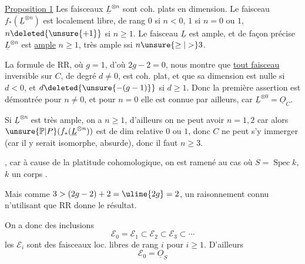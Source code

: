 

\uline{Proposition 1} Les faisceaux $\underline L^{\otimes n}$ sont coh. plats en  dimension. Le faisceau $f_*(\underline L^{\otimes n})$ est localement libre, de rang $0$ si $n<0$, $1$ si $n=0$ ou $1$, $n\deleted{\unsure{+1}}$ si $n\geq1$.  Le faisceau $\underline L$ est ample, et de façon précise $\underline L^{\otimes n}$ est  \uline{ample}   $n\geq1$, très ample ssi $n\unsure{\geq|>}3$.

La formule de RR, où $g=1$, d'où $2g-2=0$, nous montre que \uline{tout faisceau}  inversible sur $C$, de degré  $d\neq0$, est coh. plat, et que sa dimension est  nulle si $d<0$, et $d\deleted{\unsure{-(g-1)}}$ si $d\geq1$. Donc la première assertion est démontrée pour $n\neq0$, et pour $n=0$ elle est connue par ailleurs, car $\underline L^{\otimes0}=\underline O_C$.

Si $\underline L^{\otimes n}$ est très ample, on a $n\geq1$, d'ailleurs on ne peut avoir $n=1,2$ car alors $\unsure{\mathbb P|P}(f_*(\underline L^{\otimes n}))$ est de dim relative $0$ ou $1$, donc $C$ ne peut s'y immerger (car il y serait isomorphe, absurde), donc il faut $n\geq3$.

, car à cause de la platitude cohomologique, on est ramené au cas où $S=\operatorname{Spec}k$, $k$ un corps . 

Mais  comme $3>(2g-2)+2=\uline{2g}=2$, un raisonnement connu n'utilisant que RR donne le résultat.



 On a donc des  inclusions
\[
\mathcal E_0=\mathcal E_1\subset\mathcal E_2\subset\mathcal E_3\subset\cdots
\]
les $\mathcal E_i$ sont des faisceaux loc. libres de rang $i$ pour $i\geq1$. D'ailleurs
\[
\mathcal E_0=\underline O_S
\]

